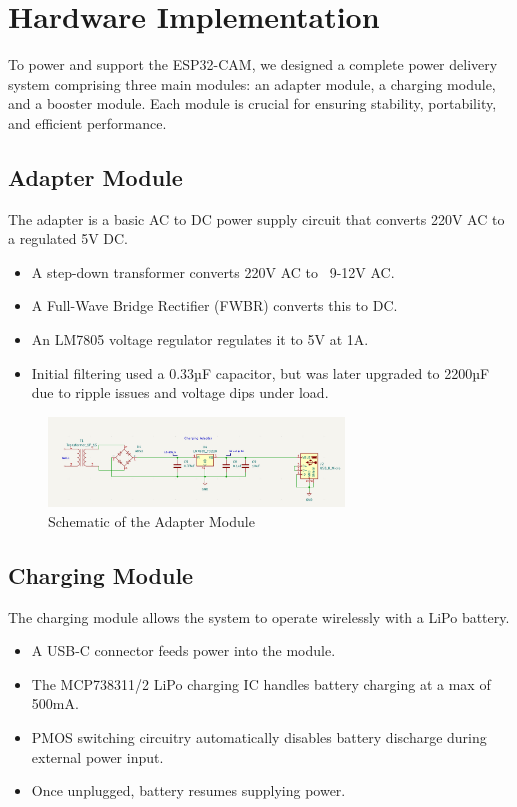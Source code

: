\chapter{Hardware Implementation}

To power and support the ESP32-CAM, we designed a complete power delivery system comprising three main modules: an adapter module, a charging module, and a booster module. Each module is crucial for ensuring stability, portability, and efficient performance.

\section{Adapter Module}

The adapter is a basic AC to DC power supply circuit that converts 220V AC to a regulated 5V DC.

\begin{itemize}
    \item A step-down transformer converts 220V AC to ~9-12V AC.
    \item A Full-Wave Bridge Rectifier (FWBR) converts this to DC.
    \item An LM7805 voltage regulator regulates it to 5V at 1A.
    \item Initial filtering used a 0.33µF capacitor, but was later upgraded to 2200µF due to ripple issues and voltage dips under load.
\end{itemize}

\begin{figure}[H]
    \centering
    \includegraphics[width=0.7\textwidth]{Adapter.png}
    \caption{Schematic of the Adapter Module}
    \label{fig:adapter_module}
\end{figure}


\section{Charging Module}

The charging module allows the system to operate wirelessly with a LiPo battery.

\begin{itemize}
    \item A USB-C connector feeds power into the module.
    \item The MCP738311/2 LiPo charging IC handles battery charging at a max of 500mA.
    \item PMOS switching circuitry automatically disables battery discharge during external power input.
    \item Once unplugged, battery resumes supplying power.
\end{itemize}

